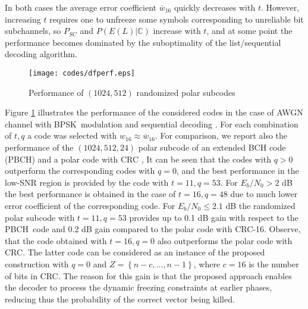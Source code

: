 \documentclass[conference]{IEEEtran}
\theoremstyle{plain}
\newcommand{\set}[1]{\left\{{#1}\right\}}
\begin{document}
In both cases the average error coefficient $\overline w_{16}$ quickly decreases with $t$. However, increasing $t$ requires one to unfreeze some symbols corresponding to unreliable bit subchannels, so $P_{SC}$ and $P(E(L)|\mathbb C)$ increase with $t$, and at some point the performance becomes dominated by the suboptimality of the list/sequential decoding algorithm.
\begin{figure}
\texttt{[image: codes/dfperf.eps]}
\caption{Performance of $(1024,512)$ randomized   polar    subcodes}
\label{f1024512}
\end{figure}
Figure \ref{f1024512} illustrates the performance of the considered codes in the case of AWGN channel with BPSK\ modulation and sequential decoding \cite{miloslavskaya2014sequential}. For each combination of $t,q$ a code was selected with $w_{16}\approx\overline w_{16}$. For comparison, we report also the performance of the $(1024,512,24)$ polar subcode of an extended BCH code (PBCH) and a polar code with CRC \cite{trifonov2016polar}, It can be seen that the codes with $q>0$ outperform the corresponding codes with $q=0$, and 
the best performance in the low-SNR region is provided by the code with $t=11,q=53$. For $E_b/N_0>2$ dB the best performance is obtained in the case of $t=16,q=48$ due to much lower error coefficient of the corresponding code.
For $E_b/N_0 \leq 2.1$ dB the randomized polar subcode with $t=11,q=53$ provides up to 0.1 dB gain  with respect to the PBCH\ code and 0.2 dB gain compared to the polar code with CRC-16. Observe, that the code obtained with $t=16,q=0$ also outperforms the polar code with CRC. The latter code can be considered as an instance of the proposed construction with $q=0$ and $Z=\set{n-c,\dots,n-1}$, where $c=16$ is the number of bits in CRC. The reason for this gain is that the proposed approach enables the decoder to process the dynamic freezing constraints at earlier phases, reducing thus the probability of the correct vector being killed.
\end{document}
